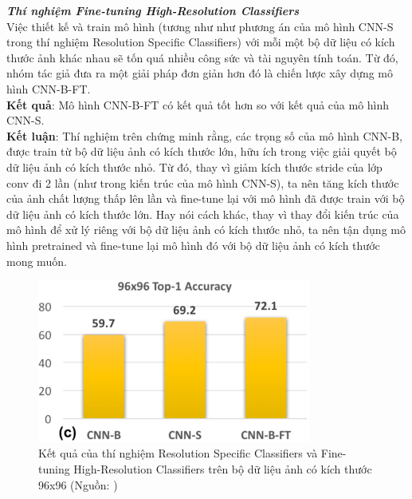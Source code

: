 {    \noindent
    \textbf{\textit{Thí nghiệm Fine-tuning High-Resolution Classifiers}} \\
    Việc thiết kế và train mô hình (tương như như phương án của mô hình CNN-S trong thí nghiệm Resolution Specific Classifiers) với mỗi một bộ dữ liệu có kích thước ảnh khác nhau sẽ tốn quá nhiều công sức và tài nguyên tính toán.
    Từ đó, nhóm tác giả đưa ra một giải pháp đơn giản hơn đó là chiến lược xây dựng mô hình CNN-B-FT. \\
    \textbf{Kết quả}: Mô hình CNN-B-FT có kết quả tốt hơn so với kết quả của mô hình CNN-S. \\
    \textbf{Kết luận}: Thí nghiệm trên chứng minh rằng, các trọng số của mô hình CNN-B, được train từ bộ dữ liệu ảnh có kích thước lớn, hữu ích trong việc giải quyết bộ dữ liệu ảnh có kích thước nhỏ.
    Từ đó, thay vì giảm kích thước stride của lớp conv đi 2 lần (như trong kiến trúc của mô hình CNN-S), ta nên tăng kích thước của ảnh chất lượng thấp lên lần và fine-tune lại với mô hình đã được train với bộ dữ liệu ảnh có kích thước lớn.
    Hay nói cách khác, thay vì thay đổi kiến trúc của mô hình để xử lý riêng với bộ dữ liệu ảnh có kích thước nhỏ, ta nên tận dụng mô hình pretrained và fine-tune lại mô hình đó với bộ dữ liệu ảnh có kích thước mong muốn.

    \begin{figure}[H]
        \centering
        \includegraphics[width=9cm] {images/snip_res_spec_cls_96}
        \caption{Kết quả của thí nghiệm Resolution Specific Classifiers và Fine-tuning High-Resolution Classifiers trên bộ dữ liệu ảnh có kích thước 96x96 (Nguồn: \cite{singh2018analysis})}
        \label{fig:snip_res_spec_cls_96}
    \end{figure}

}
